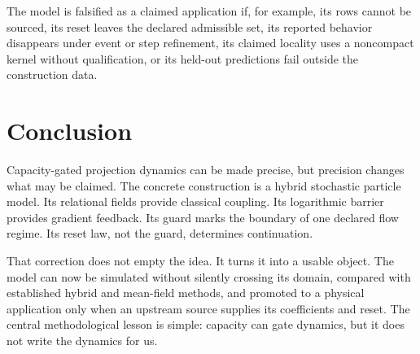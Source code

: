 \documentclass[11pt]{article}
\theoremstyle{definition}
\theoremstyle{remark}
\begin{document}
The model is falsified as a claimed application if, for example, its rows
cannot be sourced, its reset leaves the declared admissible set, its
reported behavior disappears under event or step refinement, its claimed
locality uses a noncompact kernel without qualification, or its held-out
predictions fail outside the construction data.

\section{Conclusion}
\label{sec:conclusion}

Capacity-gated projection dynamics can be made precise, but precision
changes what may be claimed.  The concrete construction is a hybrid
stochastic particle model.  Its relational fields provide classical
coupling.  Its logarithmic barrier provides gradient feedback.  Its guard
marks the boundary of one declared flow regime.  Its reset law, not the
guard, determines continuation.

That correction does not empty the idea.  It turns it into a usable object.
The model can now be simulated without silently crossing its domain,
compared with established hybrid and mean-field methods, and promoted to a
physical application only when an upstream source supplies its coefficients
and reset.  The central methodological lesson is simple: capacity can gate
dynamics, but it does not write the dynamics for us.



\end{document}
